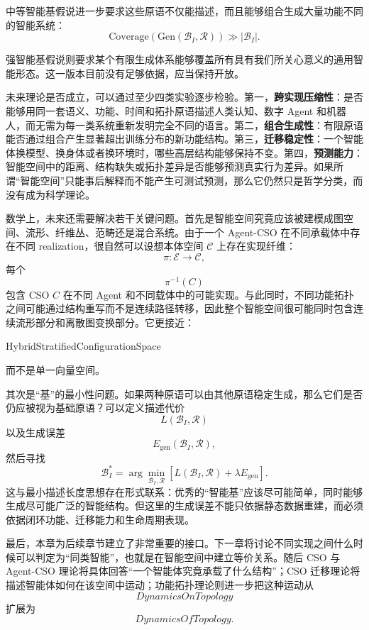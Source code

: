中等智能基假说进一步要求这些原语不仅能描述，而且能够组合生成大量功能不同的智能系统：
\[
\mathrm{Coverage}
\left(
\mathrm{Gen}(\mathcal B_I,\mathcal R)
\right)
\gg
|\mathcal B_I|.
\]

强智能基假说则要求某个有限生成体系能够覆盖所有具有我们所关心意义的通用智能形态。这一版本目前没有足够依据，应当保持开放。

未来理论是否成立，可以通过至少四类实验逐步检验。第一，\textbf{跨实现压缩性}：是否能够用同一套语义、功能、时间和拓扑原语描述人类认知、数字 Agent 和机器人，而无需为每一类系统重新发明完全不同的语言。第二，\textbf{组合生成性}：有限原语能否通过组合产生显著超出训练分布的新功能结构。第三，\textbf{迁移稳定性}：一个智能体换模型、换身体或者换环境时，哪些高层结构能够保持不变。第四，\textbf{预测能力}：智能空间中的距离、结构缺失或拓扑差异是否能够预测真实行为差异。如果所谓“智能空间”只能事后解释而不能产生可测试预测，那么它仍然只是哲学分类，而没有成为科学理论。

数学上，未来还需要解决若干关键问题。首先是智能空间究竟应该被建模成图空间、流形、纤维丛、范畴还是混合系统。由于一个 Agent-CSO 在不同承载体中存在不同 realization，很自然可以设想本体空间 $\mathcal C$ 上存在实现纤维：
\[
\pi:
\mathcal E
\rightarrow
\mathcal C,
\]
每个
\[
\pi^{-1}(C)
\]
包含 CSO $C$ 在不同 Agent 和不同载体中的可能实现。与此同时，不同功能拓扑之间可能通过结构重写而不是连续路径转移，因此整个智能空间很可能同时包含连续流形部分和离散图变换部分。它更接近：
\begin{statementbox}
HybridStratifiedConfigurationSpace
\end{statementbox}
而不是单一向量空间。

其次是“基”的最小性问题。如果两种原语可以由其他原语稳定生成，那么它们是否仍应被视为基础原语？可以定义描述代价
\[
L(\mathcal B_I,\mathcal R)
\]
以及生成误差
\[
E_{\mathrm{gen}}(\mathcal B_I,\mathcal R),
\]
然后寻找
\[
\boxed{
\mathcal B_I^*
=
\arg\min_{\mathcal B_I,\mathcal R}
\left[
L(\mathcal B_I,\mathcal R)
+
\lambda
E_{\mathrm{gen}}
\right].
}
\]
这与最小描述长度思想存在形式联系：优秀的“智能基”应该尽可能简单，同时能够生成尽可能广泛的智能结构。但这里的生成误差不能只依据静态数据重建，而必须依据闭环功能、迁移能力和生命周期表现。

最后，本章为后续章节建立了非常重要的接口。下一章将讨论不同实现之间什么时候可以判定为“同类智能”，也就是在智能空间中建立等价关系。随后 CSO 与 Agent-CSO 理论将具体回答“一个智能体究竟承载了什么结构”；CSO 迁移理论将描述智能体如何在该空间中运动；功能拓扑理论则进一步把这种运动从
\[
DynamicsOnTopology
\]
扩展为
\[
DynamicsOfTopology.
\]

